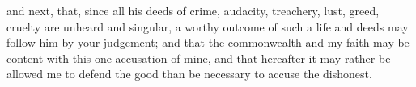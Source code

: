  and next, that, since all his deeds of crime, audacity, treachery, lust, greed, cruelty are unheard and singular, a worthy outcome of such a life and deeds may follow him by your judgement; and that the commonwealth and my faith may be content with this one accusation of mine, and that hereafter it may rather be allowed me to defend the good than be necessary to accuse the dishonest.


